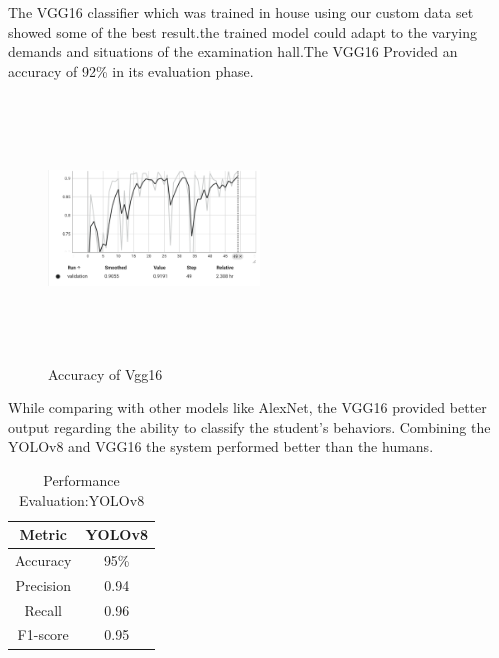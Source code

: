 \documentclass[conference]{IEEEtran}
\begin{document}
The VGG16 classifier which was trained in house using our custom data set showed some of the best result.the trained model could adapt to the varying demands and situations of the examination hall.The VGG16 Provided an accuracy of 92\% in its evaluation phase.

\begin{figure}[htbp]
\centering
\includegraphics[width=0.5\textwidth, height=7cm]{images/Vgg16acc.png}  
\caption{Accuracy of Vgg16}
\label{fig}
\end{figure}

While comparing with other models like AlexNet, the VGG16 provided better output regarding the ability to classify the student's behaviors. Combining the YOLOv8 and VGG16 the system performed better than the humans. 




\begin{table}[htbp]
\caption{Performance Evaluation:YOLOv8}
\label{tab2} %
\begin{center}
\begin{tabular}{|c|c|}
\hline
\textbf{Metric} & \textbf{YOLOv8} \\ %
\hline
Accuracy & 95\% \\ %

\hline
Precision&0.94\\
\hline
Recall&0.96\\
\hline
 F1-score&0.95 \\

\hline
\end{tabular}
\end{center}
\end{table}
\end{document}
